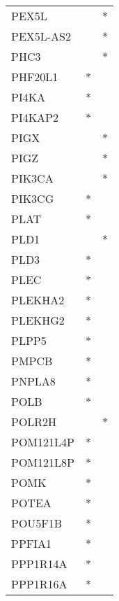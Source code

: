 \begin{longtable}{lcc}
PEX5L            &                &          * \\
PEX5L-AS2        &                &          * \\
PHC3             &                &          * \\
PHF20L1          &              * &            \\
PI4KA            &              * &            \\
PI4KAP2          &              * &            \\
PIGX             &                &          * \\
PIGZ             &                &          * \\
PIK3CA           &                &          * \\
PIK3CG           &              * &            \\
PLAT             &              * &            \\
PLD1             &                &          * \\
PLD3             &              * &            \\
PLEC             &              * &            \\
PLEKHA2          &              * &            \\
PLEKHG2          &              * &            \\
PLPP5            &              * &            \\
PMPCB            &              * &            \\
PNPLA8           &              * &            \\
POLB             &              * &            \\
POLR2H           &                &          * \\
POM121L4P        &              * &            \\
POM121L8P        &              * &            \\
POMK             &              * &            \\
POTEA            &              * &            \\
POU5F1B          &              * &            \\
PPFIA1           &              * &            \\
PPP1R14A         &              * &            \\
PPP1R16A         &              * &            \\

\end{longtable}
